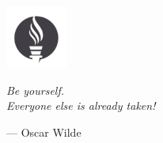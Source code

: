 \thispagestyle{pretext}

\vspace*{\fill}

\begin{adjustwidth}{8cm}{}

    \begin{center}
        \includegraphics[width=2cm]{Figuras/placeholder_epigraph.png}
    \end{center}

    \noindent\textit{
        Be yourself. \\
        Everyone else is already taken!
    }
    \begin{flushright}
        — Oscar Wilde
    \end{flushright}
\end{adjustwidth}

\newpage